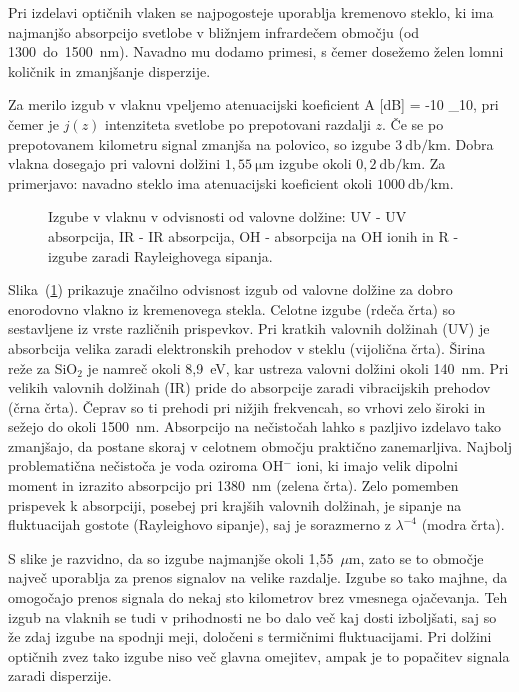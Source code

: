 Pri izdelavi optičnih vlaken se najpogosteje uporablja kremenovo steklo, ki 
ima najmanjšo absorpcijo svetlobe v bližnjem infrardečem območju (od 1300~do~1500~nm).
Navadno mu dodamo primesi, s čemer dosežemo želen lomni količnik in 
zmanjšanje disperzije. 

Za merilo izgub v vlaknu vpeljemo atenuacijski koeficient 
\beq
A [dB] = -10 \log_{10},
\label{dB}
\eeq
pri čemer je $j(z)$ intenziteta svetlobe po prepotovani razdalji $z$. Če se po prepotovanem
kilometru signal zmanjša na polovico, so izgube $3~\si{\decibel/\kilo\meter}$.
Dobra vlakna dosegajo pri valovni dolžini $1,55~\si{\micro\meter}$ izgube okoli 
$0,2~\si{\decibel/\kilo\meter}$. 
Za primerjavo: navadno steklo ima atenuacijski koeficient okoli 
$1000~\si{\decibel/\kilo\meter}$.

\begin{figure}[h]
\centering
\def\svgwidth{90truemm} 
 
\caption{Izgube v vlaknu v odvisnosti od valovne dolžine: UV - UV absorpcija, 
IR - IR absorpcija, OH - absorpcija na OH ionih in R - izgube zaradi Rayleighovega sipanja.}
\label{FibAbs}
\end{figure}
Slika~(\ref{FibAbs}) prikazuje značilno odvisnost izgub od valovne dolžine 
za dobro enorodovno vlakno iz kremenovega stekla. Celotne izgube (rdeča črta)
so sestavljene iz vrste različnih prispevkov. 
Pri kratkih valovnih dolžinah (UV) je absorbcija velika zaradi elektronskih prehodov
v steklu (vijolična črta). Širina reže za SiO$_2$ je namreč okoli 8,9~eV, kar ustreza valovni dolžini
okoli 140~nm. Pri velikih valovnih dolžinah (IR) pride do absorpcije zaradi
vibracijskih prehodov (črna črta). Čeprav so ti prehodi pri nižjih frekvencah, 
so vrhovi zelo široki in sežejo do okoli 1500~nm. Absorpcijo na nečistočah lahko s pazljivo 
izdelavo tako zmanjšajo, da postane skoraj v celotnem območju praktično zanemarljiva. 
Najbolj problematična nečistoča je voda oziroma OH$^{-}$ ioni, ki imajo velik dipolni
moment in izrazito absorpcijo pri 1380~nm (zelena črta). Zelo pomemben prispevek k 
absorpciji, posebej pri krajših valovnih dolžinah, je sipanje na fluktuacijah 
gostote (Rayleighovo sipanje), saj je sorazmerno z $\lambda^{-4}$ (modra črta). 

S slike je razvidno, da so izgube najmanjše
okoli 1,55~$\mu$m, zato se to območje največ uporablja za prenos signalov
na velike razdalje. Izgube so tako majhne, da omogočajo prenos signala 
do nekaj sto kilometrov brez vmesnega ojačevanja. Teh izgub na vlaknih se tudi v prihodnosti 
ne bo dalo več kaj dosti izboljšati, saj so že zdaj izgube na spodnji meji,
določeni s termičnimi fluktuacijami. Pri dolžini optičnih zvez tako izgube niso več glavna
omejitev, ampak je to popačitev signala zaradi disperzije.

